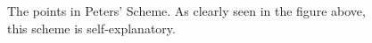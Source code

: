 %
\begin{figure}

\label{fig:PetersPoints}
\caption{The points in Peters' Scheme. As clearly seen in the figure above, this scheme is self-explanatory.}
\end{figure}
